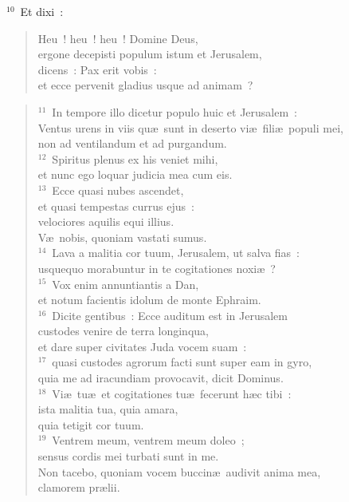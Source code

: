 ${}^{10}$~Et dixi~: \begin{flushleft}\begin{verse}Heu~! heu~! heu~! Domine Deus,\\ ergone decepisti populum istum et Jerusalem,\\ dicens~: Pax erit vobis~:\\ et ecce pervenit gladius usque ad animam~?\end{verse}\end{flushleft}


\begin{flushleft}\begin{verse}${}^{11}$~In tempore illo dicetur populo huic et Jerusalem~:\\ Ventus urens in viis qu\ae\ sunt in deserto vi\ae\ fili\ae\ populi mei,\\ non ad ventilandum et ad purgandum.\\
${}^{12}$~Spiritus plenus ex his veniet mihi,\\ et nunc ego loquar judicia mea cum eis.\\
${}^{13}$~Ecce quasi nubes ascendet,\\ et quasi tempestas currus ejus~:\\ velociores aquilis equi illius.\\ V\ae\ nobis, quoniam vastati sumus.\\
${}^{14}$~Lava a malitia cor tuum, Jerusalem, ut salva fias~:\\ usquequo morabuntur in te cogitationes noxi\ae~?\\
${}^{15}$~Vox enim annuntiantis a Dan,\\ et notum facientis idolum de monte Ephraim.\\
${}^{16}$~Dicite gentibus~: Ecce auditum est in Jerusalem\\ custodes venire de terra longinqua,\\ et dare super civitates Juda vocem suam~:\\
${}^{17}$~quasi custodes agrorum facti sunt super eam in gyro,\\ quia me ad iracundiam provocavit, dicit Dominus.\\
${}^{18}$~Vi\ae\ tu\ae\ et cogitationes tu\ae\ fecerunt h\ae c tibi~:\\ ista malitia tua, quia amara,\\ quia tetigit cor tuum.\\
${}^{19}$~Ventrem meum, ventrem meum doleo~;\\ sensus cordis mei turbati sunt in me.\\ Non tacebo, quoniam vocem buccin\ae\ audivit anima mea,\\ clamorem pr\ae lii.\\

\end{verse}
\end{flushleft}

